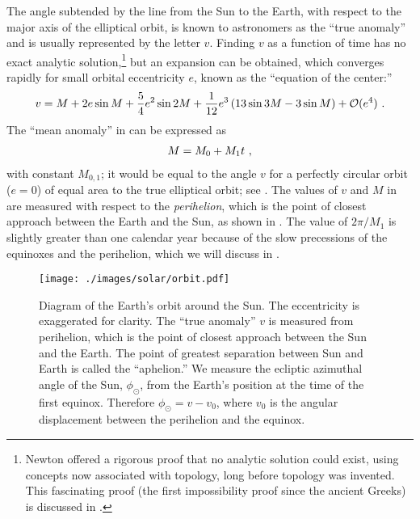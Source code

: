 The angle subtended by the line from the Sun to the Earth, with respect to the major axis of the elliptical orbit, is known to astronomers as the ``true anomaly'' and is usually represented by the letter $v$.  Finding $v$ as a function of time has no exact analytic solution,\footnote{Newton offered a rigorous proof that no analytic solution could exist, using concepts now associated with topology, long before topology was invented.  This fascinating proof (the first impossibility proof since the ancient Greeks) is discussed in \cite{Arnold,Chandra}.} but an expansion can be obtained, which converges rapidly for small orbital eccentricity $e$, known as the ``equation of the center:''
\begin{eqnarray}
v = M + 2 e \sin M + \frac{5}{4} e^2 \sin 2M + \frac{1}{12} e^3 \left( 13 \sin 3M - 3 \sin M \right) + {\cal O}(e^4)~.
\la{eq:center}
\end{eqnarray}
The ``mean anomaly'' in  can be expressed as
\begin{eqnarray}
M = M_0 + M_1 t~,
\la{eq:mean}
\end{eqnarray}
with constant $M_{0,1}$; it would be equal to the angle $v$ for a perfectly circular orbit ($e=0$) of equal area to the true elliptical orbit; see \cite{Danby}.  The values of $v$ and $M$ in  are measured with respect to the {\it perihelion}, which is the point of closest approach between the Earth and the Sun, as shown in .  The value of $2 \pi / M_1$ is slightly greater than one calendar year because of the slow precessions of the equinoxes and the perihelion, which we will discuss in . 

\begin{figure} [htb]
\begin{center}
	\texttt{[image: ./images/solar/orbit.pdf]}
\end{center}
\caption{\small Diagram of the Earth's orbit around the Sun.  The eccentricity is exaggerated for clarity.  The ``true anomaly'' $v$ is measured from perihelion, which is the point of closest approach between the Sun and the Earth.  The point of greatest separation between Sun and Earth is called the ``aphelion.''  We measure the ecliptic azimuthal angle of the Sun, $\phi_\odot$, from the Earth's position at the time of the first equinox.  Therefore $\phi_\odot = v - v_0$, where $v_0$ is the angular displacement between the perihelion and the equinox.}
\end{figure}

